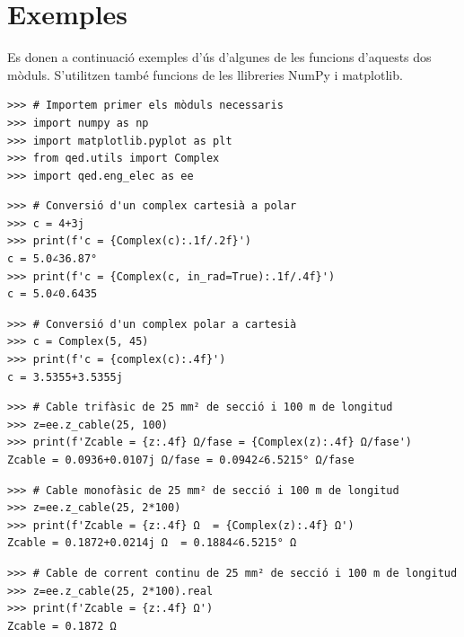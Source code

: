 


\section{Exemples}\label{sec:exemples-qed}
Es donen a continuació  exemples d'ús d'algunes de les funcions d'aquests dos mòduls. S'utilitzen també funcions de les llibreries NumPy i  matplotlib.

\begin{lstlisting}
>>> # Importem primer els mòduls necessaris
>>> import numpy as np
>>> import matplotlib.pyplot as plt
>>> from qed.utils import Complex
>>> import qed.eng_elec as ee
\end{lstlisting}

\begin{lstlisting}
>>> # Conversió d'un complex cartesià a polar
>>> c = 4+3j
>>> print(f'c = {Complex(c):.1f/.2f}')
c = 5.0∠36.87°
>>> print(f'c = {Complex(c, in_rad=True):.1f/.4f}')
c = 5.0∠0.6435
\end{lstlisting} 

\begin{lstlisting}
>>> # Conversió d'un complex polar a cartesià
>>> c = Complex(5, 45)
>>> print(f'c = {complex(c):.4f}')
c = 3.5355+3.5355j
\end{lstlisting}

\begin{lstlisting}
>>> # Cable trifàsic de 25 mm² de secció i 100 m de longitud
>>> z=ee.z_cable(25, 100)
>>> print(f'Zcable = {z:.4f} Ω/fase = {Complex(z):.4f} Ω/fase')
Zcable = 0.0936+0.0107j Ω/fase = 0.0942∠6.5215° Ω/fase	
\end{lstlisting} 

\begin{lstlisting}
>>> # Cable monofàsic de 25 mm² de secció i 100 m de longitud
>>> z=ee.z_cable(25, 2*100)
>>> print(f'Zcable = {z:.4f} Ω  = {Complex(z):.4f} Ω')
Zcable = 0.1872+0.0214j Ω  = 0.1884∠6.5215° Ω	
\end{lstlisting}

\begin{lstlisting}
>>> # Cable de corrent continu de 25 mm² de secció i 100 m de longitud
>>> z=ee.z_cable(25, 2*100).real
>>> print(f'Zcable = {z:.4f} Ω')
Zcable = 0.1872 Ω	
\end{lstlisting}

